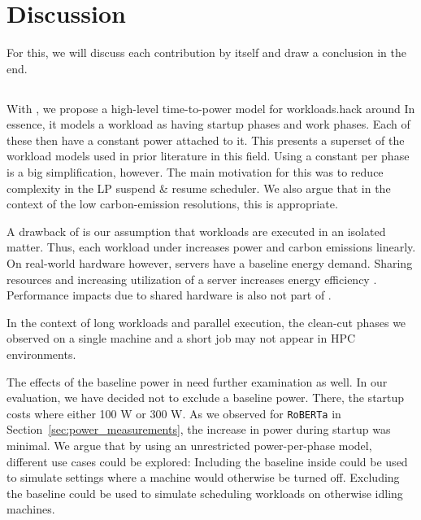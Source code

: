 \chapter{Discussion} \label{sec:discussion}

For this, we will discuss each contribution by itself and draw a conclusion in the end.

\section{\modelname{}}

With \modelname{}, we propose a high-level time-to-power model for workloads.hack around
In essence, it models a workload as having startup phases and work phases. 
Each of these then have a constant power attached to it. 
This presents a superset of the workload models used in prior literature in this field.
Using a constant per phase is a big simplification, however. 
The main motivation for this was to reduce complexity in the LP suspend \& resume scheduler.
We also argue that in the context of the low carbon-emission resolutions, this is appropriate.

A drawback of \modelname{} is our assumption that workloads are executed in an isolated matter. 
Thus, each workload under \modelname{} increases power and carbon emissions linearly.
On real-world hardware however, servers have a baseline energy demand. 
Sharing resources and increasing utilization of a server increases energy efficiency \cite{barroso_case_2007}. 
Performance impacts due to shared hardware is also not part of \modelname{}.

In the context of long workloads and parallel execution, the clean-cut phases we observed on a single machine and a short job may not appear in HPC environments.

The effects of the baseline power in \modelname{} need further examination as well.
In our evaluation, we have decided not to exclude a baseline power. There, the startup costs where either 100 W or 300 W. As we observed for \verb|RoBERTa| in Section~\ref{sec:power_measurements}, the increase in power during startup was minimal. 
We argue that by using an unrestricted power-per-phase model, different use cases could be explored:
Including the baseline inside \modelname{} could be used to simulate settings where a machine would otherwise be turned off. 
Excluding the baseline could be used to simulate scheduling workloads on otherwise idling machines.

\section{\programname{}}

